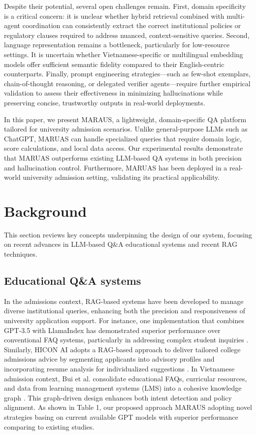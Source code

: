 \documentclass[runningheads]{llncs}
\begin{document}
Despite their potential, several open challenges remain. First, domain specificity is a critical concern: it is unclear whether hybrid retrieval combined with multi-agent coordination can consistently extract the correct institutional policies or regulatory clauses required to address nuanced, context-sensitive queries. Second, language representation remains a bottleneck, particularly for low-resource settings. It is uncertain whether Vietnamese-specific or multilingual embedding models offer sufficient semantic fidelity compared to their English-centric counterparts. Finally, prompt engineering strategies—such as few-shot exemplars, chain-of-thought reasoning, or delegated verifier agents—require further empirical validation to assess their effectiveness in minimizing hallucinations while preserving concise, trustworthy outputs in real-world deployments.
 
In this paper, we present MARAUS, a lightweight, domain-specific QA platform tailored for university admission scenarios. Unlike general-purpose LLMs such as ChatGPT, MARUAS can handle specialized queries that require domain logic, score calculations, and local data access. Our experimental results demonstrate that MARUAS outperforms existing LLM-based QA systems in both precision and hallucination control. Furthermore, MARUAS has been deployed in a real-world university admission setting, validating its practical applicability.
\section{Background}
\label{sec:background}

This section reviews key concepts underpinning the design of our system, focusing on recent advances in LLM-based Q\&A educational systems and recent RAG techniques.

\subsection{Educational Q\&A systems}
In the admissions context, RAG-based systems have been developed to manage diverse institutional queries, enhancing both the precision and responsiveness of university application support. For instance, one implementation that combines GPT-3.5 with LlamaIndex has demonstrated superior performance over conventional FAQ systems, particularly in addressing complex student inquiries \cite{chen_facilitating_2024}. Similarly, HICON AI adopts a RAG-based approach to deliver tailored college admissions advice by segmenting applicants into advisory profiles and incorporating resume analysis for individualized suggestions \cite{singla_hicon_2024}.
In Vietnamese admission context, Bui et al. consolidate educational FAQs, curricular resources, and data from learning management systems (LMS) into a cohesive knowledge graph \cite{bui_cross-data_2024}. This graph-driven design enhances both intent detection and policy alignment. As shown in Table 1, our proposed approach MARAUS adopting novel strategies basing on current available GPT models with superior performance comparing to existing studies.
\end{document}
